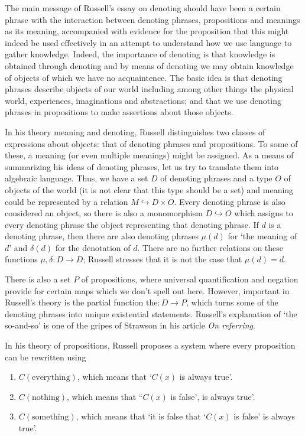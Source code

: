 \documentclass{article}
\begin{document}
\maketitle

The main message of Russell's essay on denoting should have been a certain
phrase with the interaction between denoting phrases, propositions and meanings
as its meaning, accompanied with evidence for the proposition that this might
indeed be used effectively in an attempt to understand how we use language to 
gather knowledge. Indeed, the importance of denoting is that knowledge
is obtained through denoting and by means of denoting we may obtain knowledge
of objects of which we have no acquaintence. The basic idea is that denoting
phrases describe objects of our world including among other things the physical 
world, experiences, imaginations and abstractions; and that we use denoting 
phrases in propositions to make assertions about those objects.

In his theory meaning and denoting, Russell distinguishes two classes of
expressions about objects: that of denoting phrases and
propositions. To some of these, a meaning (or even multiple meanings) might be
assigned. As a means of summarizing his ideas of denoting phrases, let us try
to translate them into algebraic language. Thus, we have a set $D$ of denoting
phrases and a type $O$ of objects of the world (it is not clear that this type
should be a set) and meaning could be represented by a relation 
$M\hookrightarrow D\times O$. Every denoting phrase is also considered an
object, so there is also a monomorphism $D \hookrightarrow O$ which assigns to
every denoting phrase the object representing that denoting phrase. If $d$ is
a denoting phrase, then there are also denoting phrases $\mu(d)$ for `the meaning
of $d$' and $\delta(d)$ for the denotation of $d$. There are no further relations
on these functions $\mu,\delta:D\to D$; Russell stresses that it is not the case
that $\mu(d)=d$.

There is also a set $P$ of propositions, where universal quantification and negation
provide for certain maps which we don't spell out here. However, important in
Russell's theory is the partial function $\text{the}:D\to P$, which turns some
of the denoting phrases into unique existential statements. Russell's explanation
of `the so-and-so' is one of the gripes of Strawson in his article \emph{On 
referring}.

In his theory of propositions, Russell proposes a system where every
proposition can be rewritten using
\begin{enumerate}
\item $C(\text{everything})$, which means that `$C(x)$ is always true'.
\item $C(\text{nothing})$, which means that ``$C(x)$ is false', is always true'.
\item $C(\text{something})$, which means that `it is false that `$C(x)$ is
false' is always true'.
\end{enumerate}
\end{document}
